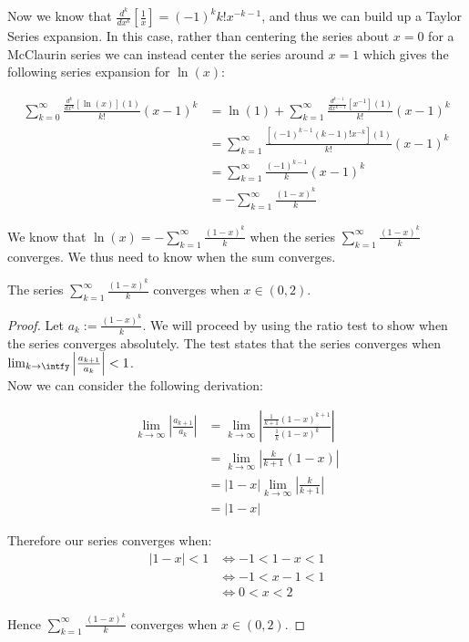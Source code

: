 Now we know that \(\frac{d^k}{dx^k}[\frac{1}{x}] = (-1)^kk!x^{-k-1}\), and thus we can build up a Taylor Series expansion. In this case, rather than centering the series about \(x=0\) for a McClaurin series we can instead center the series around \(x=1\) which gives the following series expansion for \(\ln(x)\):

\begin{align*}
	\sum_{k=0}^\infty \frac{\frac{d^k}{dx^k}[\ln(x)](1)}{k!}(x-1)^k
		&=\ln(1) + \sum_{k=1}^\infty\frac{\frac{d^{k-1}}{dx^{k-1}}
			[x^{-1}](1)}{k!}(x-1)^k\\
		&=\sum_{k=1}^\infty\frac{[(-1)^{k-1}(k-1)!x^{-k}](1)}
			{k!}(x-1)^k\\
		&=\sum_{k=1}^\infty\frac{(-1)^{k-1}}{k}(x-1)^k\\
		&=-\sum_{k=1}^\infty\frac{(1-x)^k}{k}
\end{align*}
				
We know that \(\ln(x) = -\sum_{k=1}^\infty\frac{(1-x)^k}{k}\) when the series \(\sum_{k=1}^\infty\frac{(1-x)^k}{k}\) converges. We thus need to know when the sum converges.

\begin{log convergence}
The series \(\sum_{k=1}^\infty\frac{(1-x)^k}{k}\) converges when \(x \in (0,2)\).
\end{log convergence}
\begin{proof}
Let \(a_k := \frac{(1-x)^k}{k}\). We will proceed by using the ratio test to show when the series converges absolutely. The test states that the series converges when \(\lim_{k\to\intfy} \left|\frac{a_{k+1}}{a_k}\right| < 1\).\\

Now we can consider the following derivation:

\begin{align*}
	\lim_{k\to\infty}\left|\frac{a_{k+1}}{a_k}\right|
		&=\lim_{k\to\infty}\left|\frac{\frac{1}{k+1}(1-x)^{k+1}}
			{\frac{1}{k}(1-x)^k}\right|\\
		&=\lim_{k\to\infty}\left|\frac{k}{k+1}(1-x)\right|\\
		&=|1-x|\lim_{k\to\infty}\left|\frac{k}{k+1}\right|\\
		&=|1-x|
\end{align*}

Therefore our series converges when:
\begin{align*}
	|1-x| < 1 &\iff -1 < 1 - x < 1\\
		&\iff -1 < x - 1 < 1\\
		&\iff 0 < x < 2
\end{align*}

Hence \(\sum_{k=1}^\infty \frac{(1-x)^k}{k}\) converges when \(x \in (0, 2)\).
\end{proof}

